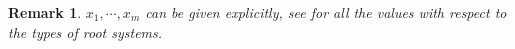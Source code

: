\documentclass[12pt]{amsart}
\newtheorem{theorem}{Theorem}[section]
\newtheorem{remark}[theorem]{Remark}
\begin{document}
%   





\begin{remark}
    $x_1,\cdots, x_m$ can be given explicitly, see \cite[Prop 10.2.5]{carter} for all the values with respect to the types of root systems.
\end{remark}



















\nocite{BGP}
\nocite{Springer}
\nocite{RINGEL1990137}
\nocite{RingelLie}
\nocite{Happelbook}
\nocite{Riedtmann}








%
\end{document}
